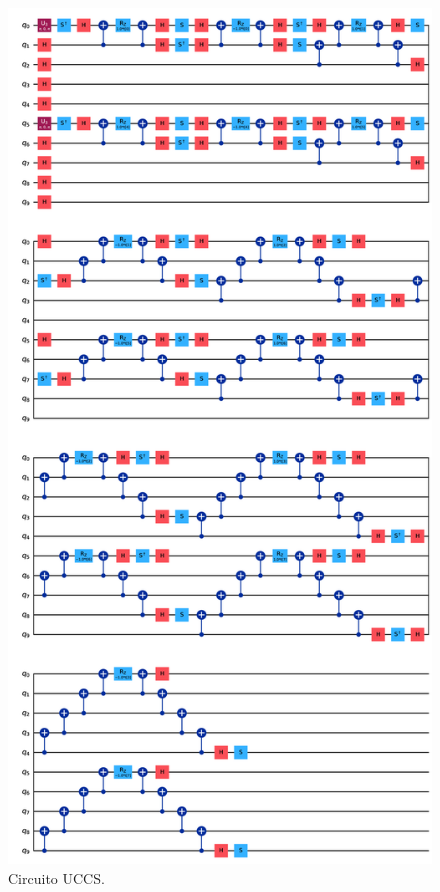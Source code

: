 \begin{minipage}{0.42\textwidth}
    \begin{figure}[H]
        \centering
        \includegraphics[width=\textwidth]{Immagini/Capitolo_3/uccs_circuit.png}
        \caption{Circuito UCCS.}
        \label{fig:circuito-uccs}
    \end{figure}
\end{minipage}

